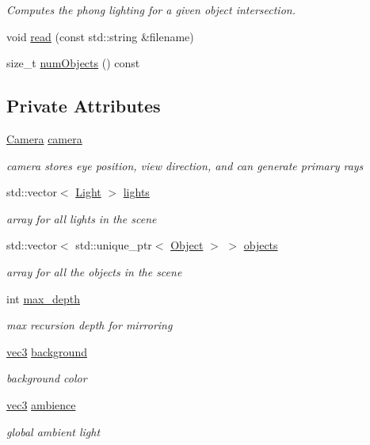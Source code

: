\begin{DoxyCompactItemize}
\begin{DoxyCompactList}\small\item\em Computes the phong lighting for a given object intersection. \end{DoxyCompactList}\item 
void \hyperlink{classScene_a15d828d5f43ff11466712b9203082316}{read} (const std\+::string \&filename)
\item 
size\+\_\+t \hyperlink{classScene_a27b9b9e915a87fd7736dd82d71da372a}{num\+Objects} () const 
\end{DoxyCompactItemize}
\subsection*{Private Attributes}
\begin{DoxyCompactItemize}
\item 
\hyperlink{classCamera}{Camera} \hyperlink{classScene_afed13ec4ba2d7ab75b273d507911b498}{camera}
\begin{DoxyCompactList}\small\item\em camera stores eye position, view direction, and can generate primary rays \end{DoxyCompactList}\item 
std\+::vector$<$ \hyperlink{structLight}{Light} $>$ \hyperlink{classScene_ab3625e4ac3c6e47156edd23e2421e828}{lights}
\begin{DoxyCompactList}\small\item\em array for all lights in the scene \end{DoxyCompactList}\item 
std\+::vector$<$ std\+::unique\+\_\+ptr$<$ \hyperlink{structObject}{Object} $>$ $>$ \hyperlink{classScene_abbd6f5b3a4639c3b089037519085bf86}{objects}
\begin{DoxyCompactList}\small\item\em array for all the objects in the scene \end{DoxyCompactList}\item 
int \hyperlink{classScene_a9150039f4d2c46a617b51c7920142d52}{max\+\_\+depth}
\begin{DoxyCompactList}\small\item\em max recursion depth for mirroring \end{DoxyCompactList}\item 
\hyperlink{classvec3}{vec3} \hyperlink{classScene_ab2f20cf753edf2f92fec9b1ad7c9b93e}{background}
\begin{DoxyCompactList}\small\item\em background color \end{DoxyCompactList}\item 
\hyperlink{classvec3}{vec3} \hyperlink{classScene_a8809b5fcac40d60ab499e90f8ae592b3}{ambience}
\begin{DoxyCompactList}\small\item\em global ambient light \end{DoxyCompactList}\end{DoxyCompactItemize}


